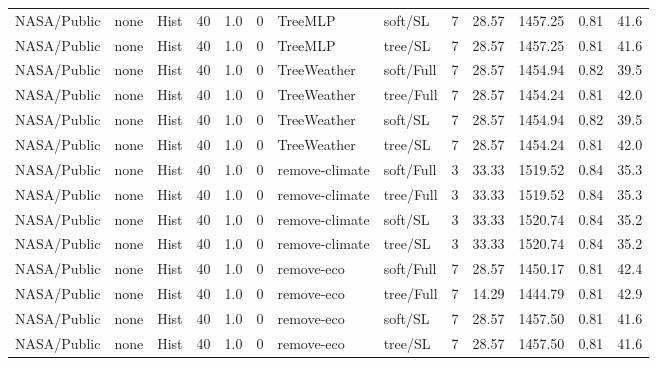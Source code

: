 \documentclass[10pt,a4paper]{article}
\begin{document}
\begin{landscape}
\begin{longtable}{llllllllrrrrr}
NASA/Public & none & Hist & 40 & 1.0 & 0 & TreeMLP & soft/SL & 7 & 28.57 & 1457.25 & 0.81 & 41.6 \\

NASA/Public & none & Hist & 40 & 1.0 & 0 & TreeMLP & tree/SL & 7 & 28.57 & 1457.25 & 0.81 & 41.6 \\

NASA/Public & none & Hist & 40 & 1.0 & 0 & TreeWeather & soft/Full & 7 & 28.57 & 1454.94 & 0.82 & 39.5 \\

NASA/Public & none & Hist & 40 & 1.0 & 0 & TreeWeather & tree/Full & 7 & 28.57 & 1454.24 & 0.81 & 42.0 \\

NASA/Public & none & Hist & 40 & 1.0 & 0 & TreeWeather & soft/SL & 7 & 28.57 & 1454.94 & 0.82 & 39.5 \\

NASA/Public & none & Hist & 40 & 1.0 & 0 & TreeWeather & tree/SL & 7 & 28.57 & 1454.24 & 0.81 & 42.0 \\

NASA/Public & none & Hist & 40 & 1.0 & 0 & remove-climate & soft/Full & 3 & 33.33 & 1519.52 & 0.84 & 35.3 \\

NASA/Public & none & Hist & 40 & 1.0 & 0 & remove-climate & tree/Full & 3 & 33.33 & 1519.52 & 0.84 & 35.3 \\

NASA/Public & none & Hist & 40 & 1.0 & 0 & remove-climate & soft/SL & 3 & 33.33 & 1520.74 & 0.84 & 35.2 \\

NASA/Public & none & Hist & 40 & 1.0 & 0 & remove-climate & tree/SL & 3 & 33.33 & 1520.74 & 0.84 & 35.2 \\

NASA/Public & none & Hist & 40 & 1.0 & 0 & remove-eco & soft/Full & 7 & 28.57 & 1450.17 & 0.81 & 42.4 \\

NASA/Public & none & Hist & 40 & 1.0 & 0 & remove-eco & tree/Full & 7 & 14.29 & 1444.79 & 0.81 & 42.9 \\

NASA/Public & none & Hist & 40 & 1.0 & 0 & remove-eco & soft/SL & 7 & 28.57 & 1457.50 & 0.81 & 41.6 \\

NASA/Public & none & Hist & 40 & 1.0 & 0 & remove-eco & tree/SL & 7 & 28.57 & 1457.50 & 0.81 & 41.6 \\


\end{longtable}
\end{landscape}
\end{document}
